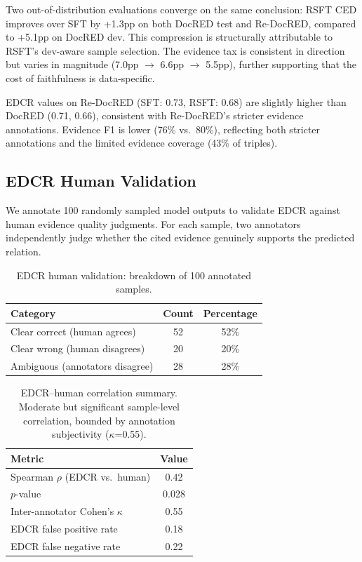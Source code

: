 \documentclass[11pt,a4paper]{article}
\newcommand{\edcr}{EDCR}
\newcommand{\ced}{CED}
\begin{document}
Two out-of-distribution evaluations converge on the same conclusion: RSFT \ced{} improves over SFT by +1.3pp on both DocRED test and Re-DocRED, compared to +5.1pp on DocRED dev.
This compression is structurally attributable to RSFT's dev-aware sample selection.
The evidence tax is consistent in direction but varies in magnitude (7.0pp $\to$ 6.6pp $\to$ 5.5pp), further supporting that the cost of faithfulness is data-specific.

\edcr{} values on Re-DocRED (SFT: 0.73, RSFT: 0.68) are slightly higher than DocRED (0.71, 0.66), consistent with Re-DocRED's stricter evidence annotations.
Evidence F1 is lower (76\% vs.\ 80\%), reflecting both stricter annotations and the limited evidence coverage (43\% of triples).

\subsection{EDCR Human Validation}
\label{sec:human_eval}

We annotate 100 randomly sampled model outputs to validate \edcr{} against human evidence quality judgments.
For each sample, two annotators independently judge whether the cited evidence genuinely supports the predicted relation.

\begin{table}[t]
\centering
\small
\begin{tabular}{lcc}
\toprule
\textbf{Category} & \textbf{Count} & \textbf{Percentage} \\
\midrule
Clear correct (human agrees) & 52 & 52\% \\
Clear wrong (human disagrees) & 20 & 20\% \\
Ambiguous (annotators disagree) & 28 & 28\% \\
\bottomrule
\end{tabular}
\caption{EDCR human validation: breakdown of 100 annotated samples.}
\label{tab:human_breakdown}
\end{table}

\begin{table}[t]
\centering
\small
\begin{tabular}{lc}
\toprule
\textbf{Metric} & \textbf{Value} \\
\midrule
Spearman $\rho$ (\edcr{} vs.\ human) & 0.42 \\
$p$-value & 0.028 \\
Inter-annotator Cohen's $\kappa$ & 0.55 \\
\edcr{} false positive rate & 0.18 \\
\edcr{} false negative rate & 0.22 \\
\bottomrule
\end{tabular}
\caption{EDCR--human correlation summary. Moderate but significant sample-level correlation, bounded by annotation subjectivity ($\kappa$=0.55).}
\label{tab:human_correlation}
\end{table}
\end{document}
